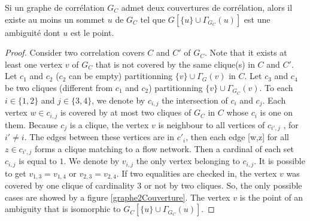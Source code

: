 	\begin{lemma}
	Si un graphe de corr\'elation $G_C$ admet deux couvertures de corr\'elation, alors il existe au moins un sommet $u$ de $G_C$ tel que $G[\{u\} \cup \Gamma_{G_C}(u)]$ est une ambiguit\'e dont $u$ est le point.
	\end{lemma}
	
	\begin{proof}
Consider two correlation covers $C$ and $C'$ of $G_C$. 
Note that it exists at least one vertex $v$ of $G_C$ that is not covered by the same clique(s) in $C$ and $C'$.
Let $c_1$ and $c_2$ ($c_2$ can be empty) partitionning $\{v\} \cup \Gamma_G(v)$ in $C$.
Let $c_3$ and $c_4$ be two cliques  (different from  $c_1$ and $c_2$) partitionning $\{v\} \cup \Gamma_G_C(v)$.
To each $i \in \{1,2\}$ and $j \in \{3,4\}$, we denote by $c_{i,j}$ the intersection of $c_i$ and $c_j$.
Each vertex $w \in c_{i,j}$ is covered by at  most two cliques of $G_C$ in $C$ whose $c_i$ is one on them.
Because  $c_j$ is a clique, the vertex $v$ is neighbour to all vertices of $c_{i',j}$ , for $i' \neq i$.
The edges between these vertices are in $c'_i$, then each edge [w,z] for all $z \in c_{i',j}$ forms a clique matching to a flow network.
Then a cardinal of each set $c_{i,j}$ is equal to $1$.
We denote  by $v_{i,j}$ the only vertex belonging to $c_{i,j}$.
It is possible to get $v_{1,3} = v_{1,4}$ or $v_{2,3} = v_{2,4}$.
If two equalities are checked in, the vertex $v$ was covered by one clique of cardinality $3$ or not by two cliques.
So, the only possible cases are showed by a figure \ref{graphe2Couverture}.
The vertex $v$ is the point of an ambiguity that is isomorphic to $G_C[\{u\} \cup \Gamma_G_C(u)]$.
	\end{proof}

